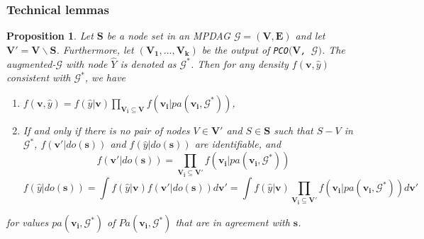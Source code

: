\documentclass{article} %
\newtheorem{proposition}{Proposition}[section]
\begin{document}
\subsubsection{Technical lemmas}
\begin{proposition}\label{prop: identification formula in G*}
    Let $\mathbf{S}$ be a node set in an MPDAG $\mathcal{G}=(\mathbf{V},\mathbf{E})$ and let $\mathbf{V'}=\mathbf{V} \backslash \mathbf{S}$. Furthermore, let $(\mathbf{V_1,...,V_k})$ be the output of \texttt{PCO$(\mathbf{V}$, $\mathcal{G})$}. The augmented-$\mathcal{G}$ with node $\hat{Y}$ is denoted as $\mathcal{G^*}$. Then for any density $f(\mathbf{v}, \hat{y})$ consistent with $\mathcal{G^{*}}$, we have
    \begin{enumerate}
        \item $f(\mathbf{v}, \hat{y}) = f(\hat{y}|\mathbf{v}) \prod_{\mathbf{V_{i}} \subseteq \mathbf{V}} f(\mathbf{v_{i}}|pa(\mathbf{v_{i}}, \mathcal{G^*}))$, 
        \item If and only if there is no pair of nodes $V \in \mathbf{V'}$ and $S \in \mathbf{S}$ such that $S-V$ in $\mathcal{G^*}$, $f(\mathbf{v'}|do(\mathbf{s}))$ and $f(\hat{y}|do(\mathbf{s}))$ are identifiable, and
        \begin{equation*}
        f(\mathbf{v'}|do(\mathbf{s})) 
        = \prod_{\mathbf{V_{i} \subseteq \mathbf{V'}}} f(\mathbf{v_i}|pa(\mathbf{v_i}, \mathcal{G^*}))
        \end{equation*}
        \begin{equation*}
        f(\hat{y}|do(\mathbf{s})) 
        = \int f(\hat{y}|\mathbf{v})f(\mathbf{v'}|do(\mathbf{s})) d \mathbf{v'} 
        = \int f(\hat{y}|\mathbf{v}) \prod_{\mathbf{V_{i} \subseteq \mathbf{V'}}} f(\mathbf{v_i}|pa(\mathbf{v_i}, \mathcal{G^*})) d \mathbf{v'} 
        \end{equation*}
    \end{enumerate}
    for values $pa(\mathbf{v_i}, \mathcal{G^*})$ of $Pa(\mathbf{v_i}, \mathcal{G^*})$ that are in agreement with $\mathbf{s}$.
\end{proposition}
\end{document}
